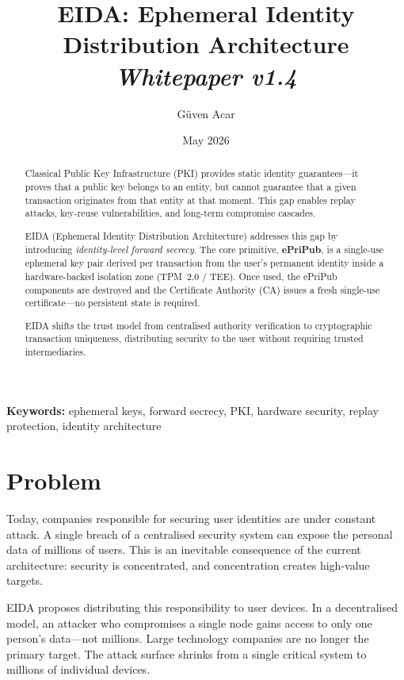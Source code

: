\documentclass[11pt,a4paper]{article}
\title{EIDA: Ephemeral Identity Distribution Architecture\\[0.4em]\large\textit{Whitepaper v1.4}}
\author{Güven Acar}
\date{May 2026}
\begin{document}
\maketitle

\begin{abstract}
Classical Public Key Infrastructure (PKI) provides static identity
guarantees---it proves that a public key belongs to an entity, but cannot
guarantee that a given transaction originates from that entity at that
moment.  This gap enables replay attacks, key-reuse vulnerabilities, and
long-term compromise cascades.

EIDA (Ephemeral Identity Distribution Architecture) addresses this gap by
introducing \emph{identity-level forward secrecy}.  The core primitive,
\textbf{ePriPub}, is a single-use ephemeral key pair derived per transaction
from the user's permanent identity inside a hardware-backed isolation zone
(TPM~2.0 / TEE).  Once used, the ePriPub components are destroyed and the
Certificate Authority (CA) issues a fresh single-use certificate---no
persistent state is required.

EIDA shifts the trust model from centralised authority verification to
cryptographic transaction uniqueness, distributing security to the user
without requiring trusted intermediaries.
\end{abstract}

\noindent\textbf{Keywords:} ephemeral keys, forward secrecy, PKI, hardware security, replay protection, identity architecture

\section{Problem}

Today, companies responsible for securing user identities are under constant
attack.  A single breach of a centralised security system can expose the
personal data of millions of users.  This is an inevitable consequence of the
current architecture: security is concentrated, and concentration creates
high-value targets.

EIDA proposes distributing this responsibility to user devices.  In a
decentralised model, an attacker who compromises a single node gains access to
only one person's data---not millions.  Large technology companies are no
longer the primary target.  The attack surface shrinks from a single critical
system to millions of individual devices.
\end{document}
